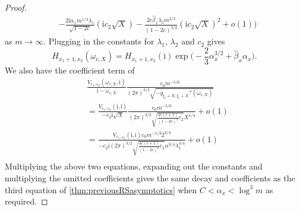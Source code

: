 \documentclass[11pt,twoside]{amsart}
\theoremstyle{plain}
\numberwithin{quest}{section}
\theoremstyle{remark}
\numberwithin{rem}{section}
\theoremstyle{definition}
\newcommand{\eps}{\varepsilon}
\begin{document}
\begin{proof}
\begin{equation*}
\begin{split}
				&-\frac{2 \mathrm{i}  \alpha_xm^{1/3} \lambda_1}{\sqrt{1-2c}}(\mathrm{i} c_2 \sqrt{X}) -\frac{2 c \hat{\beta}_x\lambda_2m^{2/3}}{(1-2c)^{3/2}}(\mathrm{i} c_2 \sqrt{X})^2 +o(1)\Bigg)
			\end{split}
		\end{equation*}
		as $m\to \infty$.  Plugging in the constants for $\lambda_1$, $\lambda_2$ and $c_2$ gives
		\begin{equation*}
			H_{x_1+1,x_2}(\omega_{c,X})= H_{x_1+1,x_2}(\mathrm{i}) \exp \big(-\frac{2}{3} \alpha_x^{3/2} + \hat{\beta}_x \alpha_x \big).
		\end{equation*}
		We also have the coefficient term of 
		\begin{equation*}
			\begin{split}
				&\frac{V_{\eps_1,\eps_2}(\omega_{c,X},\mathrm{i})}{\mathrm{i}-\omega_{c,X}} \frac{c_0 m^{-5/6}}{(2\pi)^{3/2}\sqrt{-g_{\xi_c+X,\xi_c+X}''(\omega_{c,X})}}\\
				&=\frac{V_{\eps_1,\eps_2}(\mathrm{i},\mathrm{i})}{-c_2 \mathrm{i}\sqrt{X}} \frac{c_0m^{-5/6}}{(2 \pi)^{3/2}\sqrt{\frac{4c(c+1)}{(1-2c)^2}c_2}X^{1/4}}+o(1)\\
				&=\frac{V_{\eps_1,\eps_2}(\mathrm{i},\mathrm{i}) c_0m^{-1/3}2^{3/4}}{-c_2\mathrm{i}(2 \pi)^{3/2}\sqrt{\frac{4c(c+1)}{(1-2c)^2}c_2}\alpha^{3/4}\lambda_1^{3/4}}+o(1)\\
			\end{split}
		\end{equation*}
		Multiplying the above two equations, expanding out the constants and multiplying the omitted coefficients gives the same decay and coefficients as the third equation of \cref{thm:previousRSasymptotics} when $C<\alpha_x <\log^3m$ as required.  
	\end{proof}
	
	
	
	
		
\end{document}
